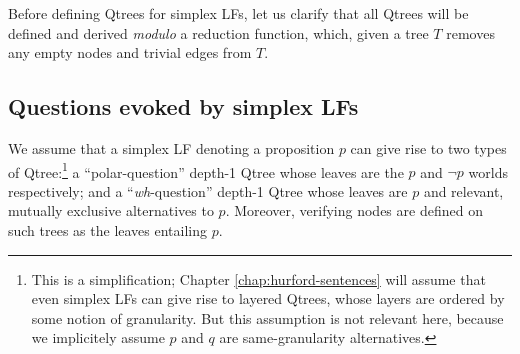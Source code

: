Before defining Qtrees for simplex LFs, let us clarify that all Qtrees will be defined and derived \textit{modulo} a reduction function, which, given a tree $T$ removes any empty nodes and trivial edges from $T$.

\begin{exe}
	\label{ex2:qtree-reduction}
\end{exe}




\subsection{Questions evoked by simplex LFs}\label{sec:simplex}
We assume that a simplex LF denoting a proposition $p$ can give rise to two types of Qtree:\footnote{This is a simplification; Chapter \ref{chap:hurford-sentences} will assume that even simplex LFs can give rise to layered Qtrees, whose layers are ordered by some notion of granularity. But this assumption is not relevant here, because we implicitely assume $p$ and $q$ are same-granularity alternatives.} a ``polar-question'' depth-1 Qtree whose leaves are the $p$ and $\neg p$ worlds respectively; and a ``\textit{wh}-question'' depth-1 Qtree whose leaves are $p$ and relevant, mutually exclusive alternatives to $p$. Moreover, verifying nodes are defined on such trees as the leaves entailing $p$.

